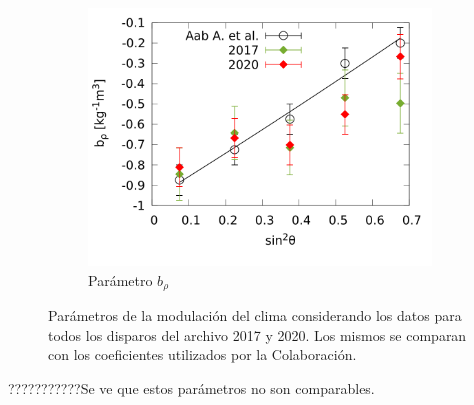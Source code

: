 \begin{figure}[H]
          \begin{subfigure}[b]{\textwidth}
          \centering
          \includegraphics[width=0.5\linewidth]{../03_IntroduccionReport/params/brho_2017_2020_above_1EeV.png}
          \caption{Parámetro  $b_\rho$   }
          \end{subfigure}%
          \caption{Parámetros de la modulación del clima considerando los datos para todos los disparos del archivo 2017 y 2020. Los mismos se comparan con los coeficientes utilizados por la Colaboración.}
        \end{figure}

      ???????????Se ve que estos parámetros no son comparables. 
